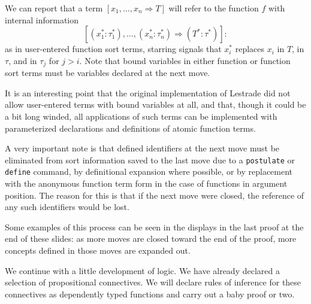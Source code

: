 \documentclass[12pt]{slides}
\begin{document}
\begin{slide}

We can report that a term $[x_1,\ldots,x_n \Rightarrow T]$ will refer to the function $f$ with internal information  $$[(x_1^*:\tau_1^*),\ldots,(x_n^*:\tau_n^*)\Rightarrow (T^*:\tau^*)]:$$  as in user-entered function sort terms, starring signals that $x_i^*$ replaces $x_i$ in $T$, in $\tau$,
and in $\tau_j$ for $j>i$.  Note that bound variables in either function or function sort terms must be variables declared at the next move.

It is an interesting point that the original implementation of Lestrade did not allow user-entered terms with bound variables at all, and that, though it could be a bit long winded, all applications of such terms can be implemented with parameterized declarations and definitions of atomic function terms.

\end{slide}

\begin{slide}

A very important note is that defined identifiers at the next move must be eliminated from sort information saved to the last move due to a {\tt postulate} or {\tt define} command, by definitional expansion where possible, or by replacement with the anonymous function term form in the case of functions in argument position.  The reason for this is that if the next move were closed, the reference of any such identifiers would be lost.

Some examples of this process can be seen in the displays in the last proof at the end of these slides:  as more moves are closed toward the end of the proof, more concepts defined in those moves are expanded out.

\end{slide}

\begin{slide}

We continue with a little development of logic.  We have already declared a selection of propositional connectives.  We will declare rules of inference for these connectives as dependently typed functions and carry out a baby proof or two.



\end{slide}
\end{document}
